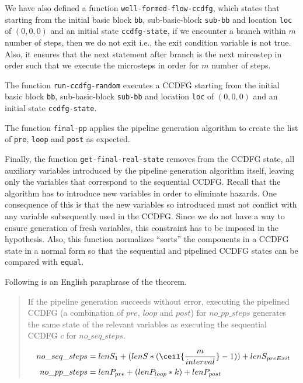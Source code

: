 We have also defined a function {\tt well\--formed\--flow\--ccdfg}, which states that starting from the initial basic block {\tt bb}, 
sub-basic-block {\tt sub-bb} and location {\tt loc} of $(0,0,0)$ and an initial state {\tt ccdfg\--state}, if we encounter a branch within $m$ number of steps, then we do not exit {i.e.}, the exit condition variable is not true.  Also, it ensures that the next statement after branch is the next mircostep in order such that we execute the microsteps in order for $m$ number of steps.

The function {\tt run-ccdfg-random} executes a CCDFG starting from the initial basic block {\tt bb}, 
sub-basic-block {\tt sub-bb} and location {\tt loc} of $(0,0,0)$ and an initial state {\tt ccdfg\--state}.

The function {\tt final-pp} applies the pipeline generation algorithm to create the  
list of {\tt pre}, {\tt loop} and {\tt post} as expected. 

Finally, the function {\tt get-final-real-state} removes from the
CCDFG state, all auxiliary variables introduced by
the pipeline generation algorithm itself, leaving only the
variables that correspond to the sequential
CCDFG. Recall that the algorithm has to introduce new variables
  in order to eliminate hazards.  One consequence of this is
  that the new variables so introduced must not conflict
  with any variable subsequently used in the CCDFG.  Since
  we do not have a way to ensure generation of fresh
  variables, this constraint has to be imposed in the
  hypothesis. Also, this function normalizes ``sorts'' the
components in a CCDFG state in a normal form so that the
sequential and pipelined CCDFG states can be compared with
{\tt equal}. 
 
Following is an English paraphrase of the theorem.
  
\begin{quote}  
If the pipeline generation succeeds without error,
executing the pipelined CCDFG (a combination of $pre$, $loop$ and $post$) for $no\_pp\_steps$
generates the same state of the relevant variables as executing the sequential CCDFG $c$ for $no\_seq\_steps$.

\small
\begin{equation}
\begin{split}
no\_seq\_steps &= len S_{1} + (len S * (\ceil{\frac{m}{interval}} - 1)) + len S_{preExit} \\
no\_pp\_steps &= len P_{pre} + (len P_{loop} * k) + len P_{post}
\end{split}
\end{equation}


\normalsize

\end{quote}

